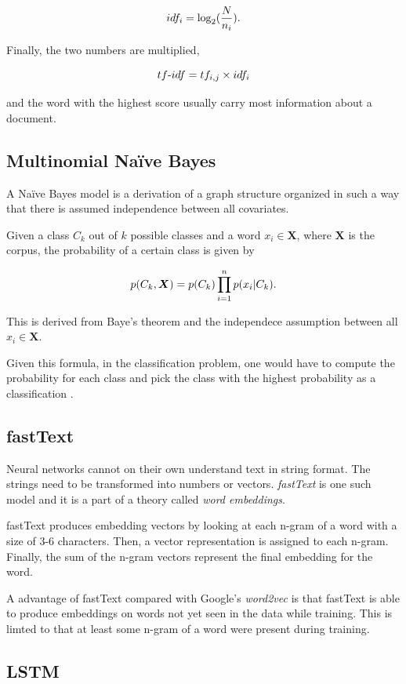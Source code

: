 \documentclass[conference]{IEEEtran}
\begin{document}
$$idf_i = \log_2(\frac{N}{n_i})\textnormal{.}$$

Finally, the two numbers are multiplied,

$$ tf\textnormal{-}idf = tf_{i,j} \times idf_i$$ 

\noindent and the word with the highest score usually carry most information about a document. \cite{tfidf}

\subsection{Multinomial Naïve Bayes}
A Naïve Bayes model is a derivation of a graph structure organized in such a way that there is assumed independence between all covariates.

Given a class $C_k$ out of $k$ possible classes and a word $x_i \in \boldsymbol{X}$, where $\boldsymbol{X}$ is the corpus, the probability of a certain class is given by


$$p(C_k, \boldsymbol{X}) = p(C_k) \prod_{i=1}^n p(x_i | C_k) \textnormal{.}$$

\noindent This is derived from Baye's theorem and the independece assumption between all $x_i \in \boldsymbol{X}$. \cite{ai-book}

Given this formula, in the classification problem, one would have to compute the probability for each class and pick the class with the highest probability as a classification \cite{itir}.

\subsection{fastText}
Neural networks cannot on their own understand text in string format. The strings need to be transformed into numbers or vectors. \textit{fastText} is one such model and it is a part of a theory called \textit{word embeddings}. 

fastText produces embedding vectors by looking at each n-gram of a word with a size of 3-6 characters. Then, a vector representation is assigned to each n-gram. Finally, the sum of the n-gram vectors represent the final embedding for the word. \cite{fasttext}

A advantage of fastText compared with Google's \textit{word2vec} \cite{word2vec} is that fastText is able to produce embeddings on words not yet seen in the data while training. This is limted to that at least some n-gram of a word were present during training. \cite{fasttext}

\subsection{LSTM}
\end{document}
